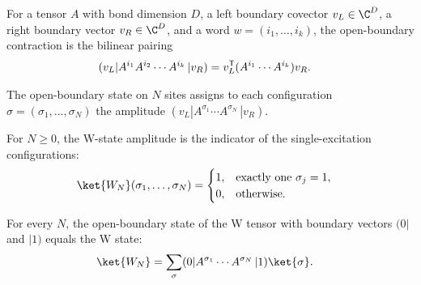 \begin{definition}\label{def:open_coeff}
    \leanok
    For a tensor $A$ with bond dimension $D$, a left boundary covector
    $v_L\in\C^D$, a right boundary vector $v_R\in\C^D$, and a word
    $w=(i_1,\ldots,i_k)$, the open-boundary contraction is the bilinear pairing
    \begin{align}
        (v_L| A^{i_1}A^{i_2}\cdots A^{i_k}\,|v_R)
         & = v_L^{\mathsf T}(A^{i_1}\cdots A^{i_k})v_R.
        \notag
    \end{align}
\end{definition}

\begin{definition}\label{def:open_state}
    \leanok
    The open-boundary state on $N$ sites assigns to each configuration
    $\sigma=(\sigma_1,\ldots,\sigma_N)$ the amplitude
    $(v_L| A^{\sigma_1}\cdots A^{\sigma_N}\,|v_R)$.
\end{definition}

\begin{definition}\label{def:w_indicator}
    \leanok
    For $N\geq 0$, the W-state amplitude is the indicator of the
    single-excitation configurations:
    \begin{align}
        \ket{W_N}(\sigma_1,\ldots,\sigma_N)
         & =
        \begin{cases}
            1, & \text{exactly one } \sigma_j=1, \\
            0, & \text{otherwise}.
        \end{cases}
        \notag
    \end{align}
\end{definition}

\begin{lemma}%
    \label{thm:w_state_identification}
    \leanok
    For every $N$, the open-boundary state of the W tensor with boundary
    vectors $(0|$ and $|1)$ equals the W state:
    \begin{align}
        \ket{W_N}
         & = \sum_{\sigma}(0| A^{\sigma_1}\cdots A^{\sigma_N}\,|1)
        \ket{\sigma}.
        \notag
    \end{align}
\end{lemma}

